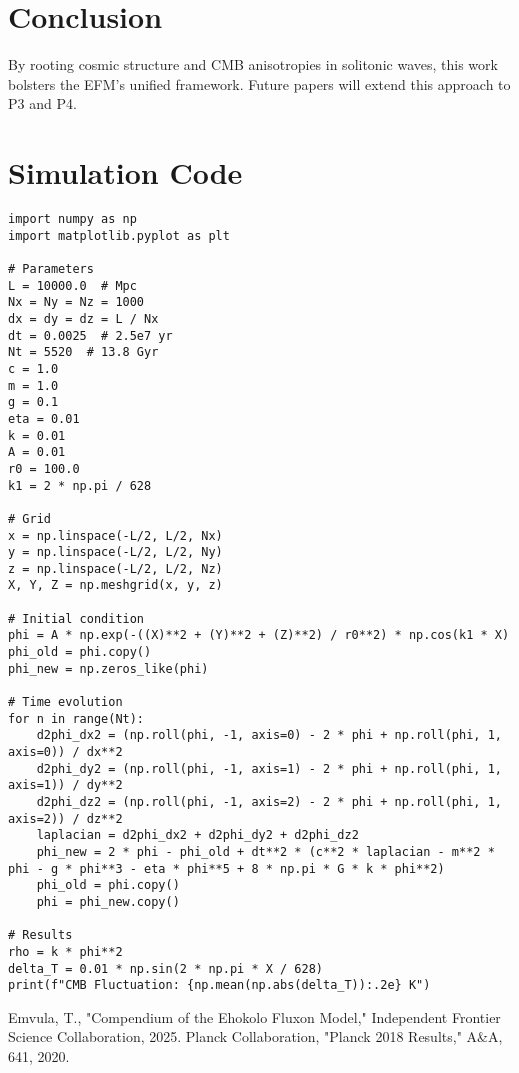 \documentclass[11pt]{article}
\begin{document}
\section{Conclusion}
By rooting cosmic structure and CMB anisotropies in solitonic waves, this work bolsters the EFM’s unified framework. Future papers will extend this approach to P3 and P4.

\appendix
\section{Simulation Code}
\lstset{language=Python, basicstyle=\footnotesize\ttfamily, breaklines=true, numbers=left}
\begin{lstlisting}
import numpy as np
import matplotlib.pyplot as plt

# Parameters
L = 10000.0  # Mpc
Nx = Ny = Nz = 1000
dx = dy = dz = L / Nx
dt = 0.0025  # 2.5e7 yr
Nt = 5520  # 13.8 Gyr
c = 1.0
m = 1.0
g = 0.1
eta = 0.01
k = 0.01
A = 0.01
r0 = 100.0
k1 = 2 * np.pi / 628

# Grid
x = np.linspace(-L/2, L/2, Nx)
y = np.linspace(-L/2, L/2, Ny)
z = np.linspace(-L/2, L/2, Nz)
X, Y, Z = np.meshgrid(x, y, z)

# Initial condition
phi = A * np.exp(-((X)**2 + (Y)**2 + (Z)**2) / r0**2) * np.cos(k1 * X)
phi_old = phi.copy()
phi_new = np.zeros_like(phi)

# Time evolution
for n in range(Nt):
    d2phi_dx2 = (np.roll(phi, -1, axis=0) - 2 * phi + np.roll(phi, 1, axis=0)) / dx**2
    d2phi_dy2 = (np.roll(phi, -1, axis=1) - 2 * phi + np.roll(phi, 1, axis=1)) / dy**2
    d2phi_dz2 = (np.roll(phi, -1, axis=2) - 2 * phi + np.roll(phi, 1, axis=2)) / dz**2
    laplacian = d2phi_dx2 + d2phi_dy2 + d2phi_dz2
    phi_new = 2 * phi - phi_old + dt**2 * (c**2 * laplacian - m**2 * phi - g * phi**3 - eta * phi**5 + 8 * np.pi * G * k * phi**2)
    phi_old = phi.copy()
    phi = phi_new.copy()

# Results
rho = k * phi**2
delta_T = 0.01 * np.sin(2 * np.pi * X / 628)
print(f"CMB Fluctuation: {np.mean(np.abs(delta_T)):.2e} K")
\end{lstlisting}




\begin{thebibliography}{9}
Emvula, T., "Compendium of the Ehokolo Fluxon Model," Independent Frontier Science Collaboration, 2025.
Planck Collaboration, "Planck 2018 Results," A\&A, 641, 2020.
\end{thebibliography}
\end{document}
